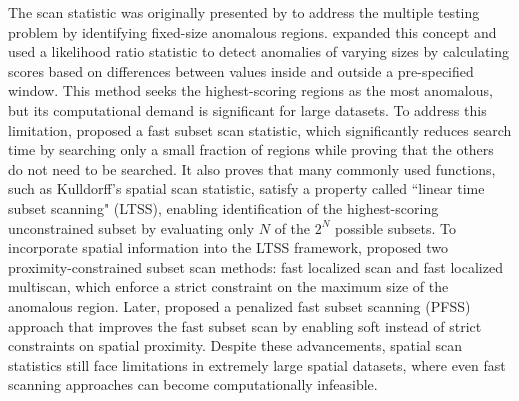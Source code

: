 \documentclass[11pt]{article}
\begin{document}
The scan statistic was originally presented by \citet{naus1965distribution} to address the multiple testing problem by identifying fixed-size anomalous regions. \citet{kulldorff1995spatial} expanded this concept and used a likelihood ratio statistic to detect anomalies of varying sizes by calculating scores based on differences between values inside and outside a pre-specified window. This method seeks the highest-scoring regions as the most anomalous, but its computational demand is significant for large datasets. To address this limitation, \citet{neill2012fast} proposed a fast subset scan statistic, which significantly reduces search time by searching only a small fraction of regions while proving that the others do not need to be searched. It also proves that many commonly used functions, such as Kulldorff's spatial scan statistic, satisfy a property called ``linear time subset scanning" (LTSS), enabling identification of the highest-scoring unconstrained subset by evaluating only $N$ of the $2^N$ possible subsets. To incorporate spatial information into the LTSS framework, \citet{neill2012fast} proposed two proximity-constrained subset scan methods: fast localized scan and fast localized multiscan, which enforce a strict constraint on the maximum size of the anomalous region. Later, \citet{speakman2016penalized} proposed a penalized fast subset scanning (PFSS) approach that improves the fast subset scan by enabling soft instead of strict constraints on spatial proximity. Despite these advancements, spatial scan statistics still face limitations in extremely large spatial datasets, where even fast scanning approaches can become computationally infeasible.
\end{document}
